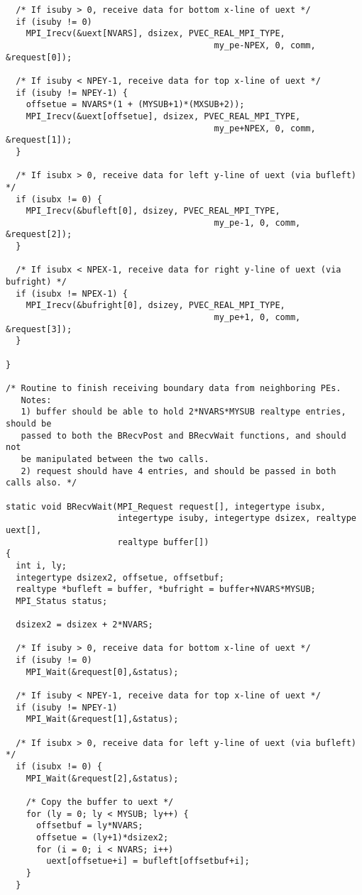 \begin{verbatim}
  /* If isuby > 0, receive data for bottom x-line of uext */
  if (isuby != 0)
    MPI_Irecv(&uext[NVARS], dsizex, PVEC_REAL_MPI_TYPE,
                                         my_pe-NPEX, 0, comm, &request[0]);

  /* If isuby < NPEY-1, receive data for top x-line of uext */
  if (isuby != NPEY-1) {
    offsetue = NVARS*(1 + (MYSUB+1)*(MXSUB+2));
    MPI_Irecv(&uext[offsetue], dsizex, PVEC_REAL_MPI_TYPE,
                                         my_pe+NPEX, 0, comm, &request[1]);
  }

  /* If isubx > 0, receive data for left y-line of uext (via bufleft) */
  if (isubx != 0) {
    MPI_Irecv(&bufleft[0], dsizey, PVEC_REAL_MPI_TYPE,
                                         my_pe-1, 0, comm, &request[2]);
  }

  /* If isubx < NPEX-1, receive data for right y-line of uext (via bufright) */
  if (isubx != NPEX-1) {
    MPI_Irecv(&bufright[0], dsizey, PVEC_REAL_MPI_TYPE,
                                         my_pe+1, 0, comm, &request[3]);
  }

}

/* Routine to finish receiving boundary data from neighboring PEs.
   Notes:
   1) buffer should be able to hold 2*NVARS*MYSUB realtype entries, should be
   passed to both the BRecvPost and BRecvWait functions, and should not
   be manipulated between the two calls.
   2) request should have 4 entries, and should be passed in both calls also. */

static void BRecvWait(MPI_Request request[], integertype isubx,
                      integertype isuby, integertype dsizex, realtype uext[],
                      realtype buffer[])
{
  int i, ly;
  integertype dsizex2, offsetue, offsetbuf;
  realtype *bufleft = buffer, *bufright = buffer+NVARS*MYSUB;
  MPI_Status status;

  dsizex2 = dsizex + 2*NVARS;

  /* If isuby > 0, receive data for bottom x-line of uext */
  if (isuby != 0)
    MPI_Wait(&request[0],&status);

  /* If isuby < NPEY-1, receive data for top x-line of uext */
  if (isuby != NPEY-1)
    MPI_Wait(&request[1],&status);

  /* If isubx > 0, receive data for left y-line of uext (via bufleft) */
  if (isubx != 0) {
    MPI_Wait(&request[2],&status);

    /* Copy the buffer to uext */
    for (ly = 0; ly < MYSUB; ly++) {
      offsetbuf = ly*NVARS;
      offsetue = (ly+1)*dsizex2;
      for (i = 0; i < NVARS; i++)
        uext[offsetue+i] = bufleft[offsetbuf+i];
    }
  }


\end{verbatim}
